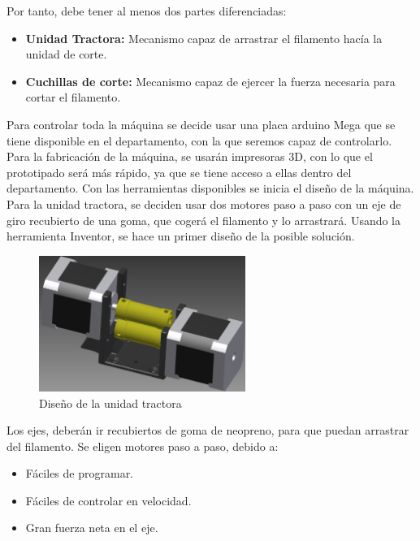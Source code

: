 Por tanto, debe tener al menos dos partes diferenciadas:

\begin{itemize}
		\item{\textbf{Unidad Tractora:} Mecanismo capaz de arrastrar el filamento hacía la unidad de corte.}
		\item{\textbf{Cuchillas de corte:} Mecanismo capaz de ejercer la fuerza necesaria para cortar el filamento.}
\end{itemize}

Para controlar toda la máquina se decide usar una placa arduino Mega que se tiene disponible en el departamento, con la que seremos capaz de controlarlo. Para la fabricación de la máquina, se usarán impresoras 3D, con lo que el prototipado será más rápido, ya que se tiene acceso a ellas dentro del departamento. Con las herramientas disponibles se inicia el diseño de la máquina.\\

Para la unidad tractora, se deciden usar dos motores paso a paso con un eje de giro recubierto de una goma, que cogerá el filamento y lo arrastrará. Usando la herramienta Inventor, se hace un primer diseño de la posible solución.

    \begin{figure}[H]
            \centering
            \includegraphics[width=0.6\textwidth]{images/peletizadora/unidadtractora.png}
            \caption{Diseño de la unidad tractora}
            \label{fig:peletizadora_tractora}
    \end{figure}

Los ejes, deberán ir recubiertos de goma de neopreno, para que puedan arrastrar del filamento. Se eligen motores paso a paso, debido a:

\begin{itemize}
	\item{Fáciles de programar.}
	\item{Fáciles de controlar en velocidad.}
	\item{Gran fuerza neta en el eje.}
\end{itemize}

